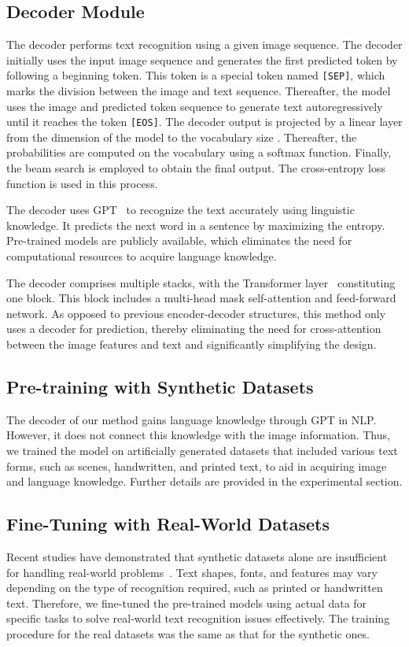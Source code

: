 \documentclass[10pt,twocolumn,letterpaper]{article}
\begin{document}
\subsection{Decoder Module}
The decoder performs text recognition using a given image sequence. 
The decoder initially uses the input image sequence and generates the first predicted token by following a beginning token.
This token is a special token named \texttt{[SEP]}, which marks the division between the image and text sequence. 
Thereafter, the model uses the image and predicted token sequence to generate text autoregressively until it reaches the token \texttt{[EOS]}. 
The decoder output is projected by a linear layer from the dimension of the model to the vocabulary size . 
Thereafter, the probabilities are computed on the vocabulary using a softmax function. 
Finally, the beam search is employed to obtain the final output. 
The cross-entropy loss function is used in this process.


The decoder uses GPT~\cite{radford2018gpt, radford2019language} to recognize the text accurately using linguistic knowledge. 
It predicts the next word in a sentence by maximizing the entropy. 
Pre-trained models are publicly available, which eliminates the need for computational resources to acquire language knowledge.

The decoder comprises multiple stacks, with the Transformer layer~\cite{vaswani2017transformer} constituting one block.
This block includes a multi-head mask self-attention and feed-forward network. 
As opposed to previous encoder-decoder structures, this method only uses a decoder for prediction, thereby eliminating the need for cross-attention between the image features and text and significantly simplifying the design. 


\subsection{Pre-training with Synthetic Datasets}
The decoder of our method gains language knowledge through GPT in NLP. 
However, it does not connect this knowledge with the image information. 
Thus, we trained the model on artificially generated datasets that included various text forms, such as scenes, handwritten, and printed text, to aid in acquiring image and language knowledge. 
Further details are provided in the experimental section.


\subsection{Fine-Tuning with Real-World Datasets}
Recent studies have demonstrated that synthetic datasets alone are insufficient for handling real-world problems~\cite{baek2021TRBA, bautista2022parseq}. 
Text shapes, fonts, and features may vary depending on the type of recognition required, such as printed or handwritten text.
Therefore, we fine-tuned the pre-trained models using actual data for specific tasks to solve real-world text recognition issues effectively.
The training procedure for the real datasets was the same as that for the synthetic ones.
\end{document}
